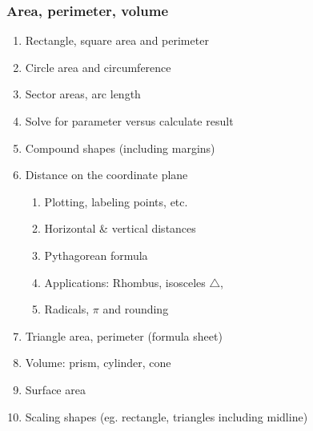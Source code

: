 \documentclass[12pt, twoside]{article}
\begin{document}
\subsubsection*{Area, perimeter, volume}
  \begin{enumerate}
  \item Rectangle, square area and perimeter
  \item Circle area and circumference
  \item Sector areas, arc length
  \item Solve for parameter versus calculate result
  \item Compound shapes (including margins)
  \item Distance on the coordinate plane
  \begin{enumerate}
    \item Plotting, labeling points, etc.
    \item Horizontal \& vertical distances
    \item Pythagorean formula
    \item Applications: Rhombus, isosceles $\triangle$,
    \item Radicals, $\pi$ and rounding
    \end{enumerate}
  \item Triangle area, perimeter (formula sheet)
  \item Volume: prism, cylinder, cone
  \item Surface area
  \item Scaling shapes (eg. rectangle, triangles including midline)
  \end{enumerate}
\end{document}
